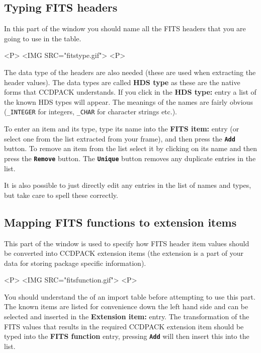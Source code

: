 \documentclass[11pt,nolof]{starlink}
\providecommand{\butt}[1]{{\bf \tt #1}}
\providecommand{\wlab}[1]{{\bf #1}}
\providecommand{\text}[1]{{\tt #1}}
\begin{document}
\subsection{Typing FITS headers }
In this part of the window you should name all the FITS headers that
you are going to use in the table.
\begin{html}
<P>
<IMG SRC="fitstype.gif">
<P>
\end{html}
The data type of the headers are also needed (these are used when
extracting the header values). The data types are called
\wlab{HDS type} as these are the native forms that CCDPACK understands. If you
click in the \wlab{HDS type:} entry a list of the known HDS types will
appear. The meanings of the names are fairly obvious (\text{\_INTEGER}
for integers, \text{\_CHAR} for character strings etc.).

To enter an item and its type, type its name into the \wlab{FITS
item:} entry (or select one from the list extracted from your
 frame), and then press the \butt{Add}
button. To remove an item from the list select it by clicking on its
name and then press the \butt{Remove} button. The \butt{Unique} button
removes any duplicate entries in the list.

It is also possible to just directly edit any entries in the list of
names and types, but take care to spell these correctly.

\subsection{Mapping FITS functions to extension items
            }
This part of the window is used to specify how FITS header item values
should be converted into CCDPACK extension items (the extension is a
part of your data for storing package specific information).
\begin{html}
<P>
<IMG SRC="fitsfunction.gif">
<P>
\end{html}

You should understand the
of an import table before attempting to use this part. The known items
are listed for convenience down the left hand side and can be selected
and inserted in the \wlab{Extension item:} entry. The transformation
of the FITS values that results in the required CCDPACK extension item
should be typed into the \wlab{FITS function} entry, pressing
\butt{Add} will then insert this into the list.
\end{document}
